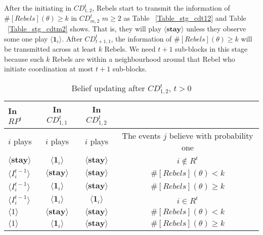 \documentclass[12pt,letter]{article}
\theoremstyle{definition}
\theoremstyle{remark}
\theoremstyle{claim}
\begin{document}
After the initiating in $CD^t_{1,2}$, Rebels start to transmit the information of $\#[Rebels](\theta)\geq k$ in $CD^t_{m,2}$ $m\geq 2$ as Table ~\ref{Table_stg_cdt12} and Table ~\ref{Table_stg_cdtm2} shows. That is, they will play $\langle \textbf{stay} \rangle$ unless they observe some one play $\langle \mathbf{1}_i \rangle$. After $CD^t_{{t+1},1}$, the information of $\#[Rebels](\theta)\geq k$ will be transmitted across at least $k$ Rebels. We need $t+1$ sub-blocks in this stage because such $k$ Rebels are within a neighbourhood around that Rebel who initiate coordination at most $t+1$ sub-blocks.
\begin{table}[t]
\caption{Belief updating after $CD^t_{1,2}$, $t>0$}
\label{Table_blf_up_cdt12}
\begin{center}
\begin{tabular}{l c c c}
In $RP^t$ 	 	&  	In $CD^t_{1,1}$		&  In $CD^t_{1,2}$	  &\\
\hline
\hline
$i$ plays 		                             &  	$i$ plays		&				$i$ plays			& The events $j$ believe with probability one  \\
\hline
$\langle  \textbf{stay} \rangle$ 	& 	$\langle \mathbf{1}_i \rangle$	&  $\langle \textbf{stay} \rangle$ &  $i\notin R^t$ \\
$\langle  {I^{t-1}_i} \rangle$ 		&  $\langle \textbf{stay} \rangle$	&	$\langle \textbf{stay} \rangle$ &  $\#[Rebels](\theta)< k$   \\
$\langle  {I^{t-1}_i} \rangle$ 		&  $\langle \mathbf{1}_i \rangle$	&	$\langle \textbf{stay} \rangle$ &  $\#[Rebels](\theta)\geq k$    \\
$\langle  {I^{t-1}_i} \rangle$ 		&  $\langle \mathbf{1}_i \rangle$	&	$\langle \mathbf{1}_i \rangle$ &  $i\in R^t$  \\
$\langle 1 \rangle$ 		             &  $\langle \textbf{stay} \rangle$	&	$\langle \textbf{stay} \rangle$ &  $\#[Rebels](\theta)< k$\\
$\langle 1 \rangle$ 		             &  $\langle \mathbf{1}_i \rangle$	&	$\langle \textbf{stay} \rangle$ & $\#[Rebels](\theta)\geq k$
\end{tabular}
\end{center}
\end{table}
\end{document}
